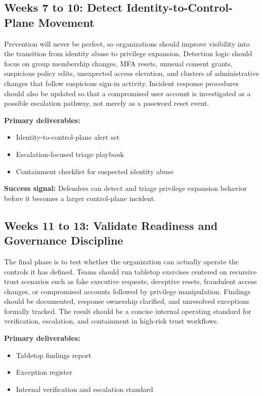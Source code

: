\documentclass[11pt]{article}
\begin{document}
\subsection{Weeks 7 to 10: Detect Identity-to-Control-Plane Movement}

Prevention will never be perfect, so organizations should improve visibility into the transition from identity abuse to privilege expansion. Detection logic should focus on group membership changes, MFA resets, unusual consent grants, suspicious policy edits, unexpected access elevation, and clusters of administrative changes that follow suspicious sign-in activity. Incident response procedures should also be updated so that a compromised user account is investigated as a possible escalation pathway, not merely as a password reset event.

\textbf{Primary deliverables:}
\begin{itemize}[leftmargin=1.5em]
    \item Identity-to-control-plane alert set
    \item Escalation-focused triage playbook
    \item Containment checklist for suspected identity abuse
\end{itemize}

\textbf{Success signal:}
Defenders can detect and triage privilege expansion behavior before it becomes a larger control-plane incident.

\subsection{Weeks 11 to 13: Validate Readiness and Governance Discipline}

The final phase is to test whether the organization can actually operate the controls it has defined. Teams should run tabletop exercises centered on recursive trust scenarios such as fake executive requests, deceptive resets, fraudulent access changes, or compromised accounts followed by privilege manipulation. Findings should be documented, response ownership clarified, and unresolved exceptions formally tracked. The result should be a concise internal operating standard for verification, escalation, and containment in high-risk trust workflows.

\textbf{Primary deliverables:}
\begin{itemize}[leftmargin=1.5em]
    \item Tabletop findings report
    \item Exception register
    \item Internal verification and escalation standard
\end{itemize}
\end{document}
